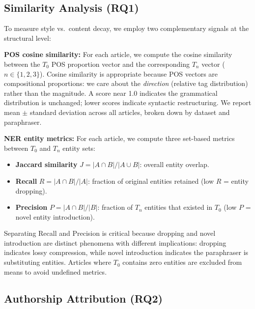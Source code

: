 \subsection{Similarity Analysis (RQ1)}

To measure style vs.\ content decay, we employ two complementary signals at the structural level:

\textbf{POS cosine similarity:} For each article, we compute the cosine similarity between the $T_0$ POS proportion vector and the corresponding $T_n$ vector ($n \in \{1,2,3\}$). Cosine similarity is appropriate because POS vectors are compositional proportions: we care about the \emph{direction} (relative tag distribution) rather than the magnitude. A score near 1.0 indicates the grammatical distribution is unchanged; lower scores indicate syntactic restructuring. We report mean $\pm$ standard deviation across all articles, broken down by dataset and paraphraser.

\textbf{NER entity metrics:} For each article, we compute three set-based metrics between $T_0$ and $T_n$ entity sets:
\begin{itemize}
    \item \textbf{Jaccard similarity} $J = |A \cap B| / |A \cup B|$: overall entity overlap.
    \item \textbf{Recall} $R = |A \cap B| / |A|$: fraction of original entities retained (low $R$ = entity dropping).
    \item \textbf{Precision} $P = |A \cap B| / |B|$: fraction of $T_n$ entities that existed in $T_0$ (low $P$ = novel entity introduction).
\end{itemize}
Separating Recall and Precision is critical because dropping and novel introduction are distinct phenomena with different implications: dropping indicates lossy compression, while novel introduction indicates the paraphraser is substituting entities. Articles where $T_0$ contains zero entities are excluded from means to avoid undefined metrics.

\subsection{Authorship Attribution (RQ2)}

